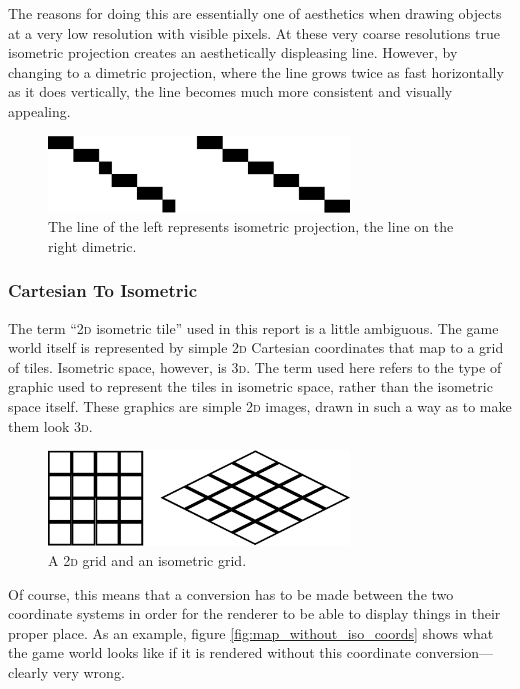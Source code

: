 The reasons for doing this are essentially one of aesthetics when drawing objects at a very low resolution with visible pixels. At these very coarse resolutions true isometric projection creates an aesthetically displeasing line. However, by changing to a dimetric projection, where the line grows twice as fast horizontally as it does vertically, the line becomes much more consistent and visually appealing.

\begin{figure}[H]
    \centering
    \includegraphics[width=8cm]{Images/iso_dimetric.eps}
    \caption{The line of the left represents isometric projection, the line on the right dimetric.}
    \label{fig:iso_dimetric}
\end{figure}


\subsubsection{Cartesian To Isometric}
The term ``\textsc{2d} isometric tile'' used in this report is a little ambiguous. The game world itself is represented by simple \textsc{2d} Cartesian coordinates that map to a grid of tiles. Isometric space, however, is \textsc{3d}. The term used here refers to the type of graphic used to represent the tiles in isometric space, rather than the isometric space itself. These graphics are simple \textsc{2d} images, drawn in such a way as to make them look \textsc{3d}.

\begin{figure}
    \centering
    \includegraphics[width=8cm]{Images/cart_iso_grid.eps}
    \caption{A \textsc{2d} grid and an isometric grid.}
    \label{fig:cart_iso_grid}
\end{figure}

Of course, this means that a conversion has to be made between the two coordinate systems in order for the renderer to be able to display things in their proper place. As an example, figure \ref{fig:map_without_iso_coords} shows what the game world looks like if it is rendered without this coordinate conversion---clearly very wrong.

